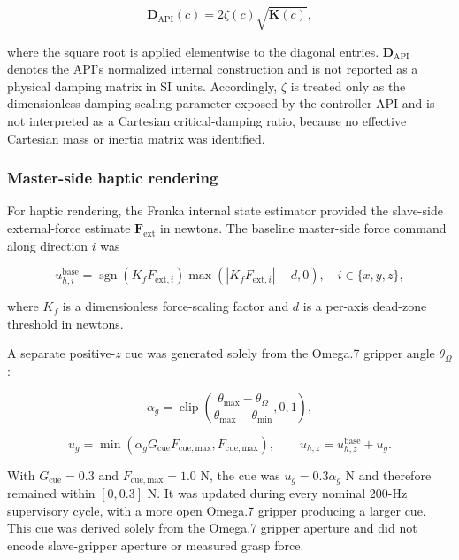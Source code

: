 \begin{equation}
\label{eq:damping-matrix}
\mathbf{D}_{\mathrm{API}}(c)=2\zeta(c)\sqrt{\mathbf{K}(c)},
\end{equation}

where the square root is applied elementwise to the diagonal entries. $\mathbf{D}_{\mathrm{API}}$ denotes the API's normalized internal construction and is not reported as a physical damping matrix in SI units. Accordingly, $\zeta$ is treated only as the dimensionless damping-scaling parameter exposed by the controller API and is not interpreted as a Cartesian critical-damping ratio, because no effective Cartesian mass or inertia matrix was identified.

\subsubsection{Master-side haptic rendering}
For haptic rendering, the Franka internal state estimator provided the slave-side external-force estimate $\mathbf{F}_{\mathrm{ext}}$ in newtons. The baseline master-side force command along direction $i$ was

\begin{equation}
\label{eq:baseline-haptic-command}
u_{h,i}^{\mathrm{base}}=
\operatorname{sgn}\!\left(K_fF_{\mathrm{ext},i}\right)
\max\!\left(\left|K_fF_{\mathrm{ext},i}\right|-d,0\right),
\quad i\in\{x,y,z\},
\end{equation}

where $K_f$ is a dimensionless force-scaling factor and $d$ is a per-axis dead-zone threshold in newtons.

A separate positive-$z$ cue was generated solely from the Omega.7 gripper angle $\theta_{\Omega}$:

\begin{equation}
\label{eq:gripper-cue-activation}
\alpha_g=\operatorname{clip}\!\left(
\frac{\theta_{\max}-\theta_{\Omega}}
{\theta_{\max}-\theta_{\min}},0,1\right),
\end{equation}

\begin{equation}
\label{eq:gripper-cue-command}
u_g=\min\!\left(\alpha_gG_{\mathrm{cue}}F_{\mathrm{cue,max}},F_{\mathrm{cue,max}}\right),
\qquad
u_{h,z}=u_{h,z}^{\mathrm{base}}+u_g.
\end{equation}

With $G_{\mathrm{cue}}=0.3$ and $F_{\mathrm{cue,max}}=1.0$ N, the cue was $u_g=0.3\alpha_g$ N and therefore remained within $[0,0.3]$ N. It was updated during every nominal 200-Hz supervisory cycle, with a more open Omega.7 gripper producing a larger cue. This cue was derived solely from the Omega.7 gripper aperture and did not encode slave-gripper aperture or measured grasp force.

